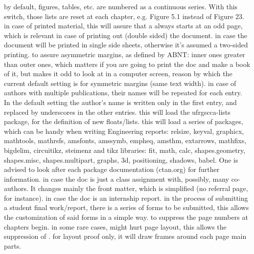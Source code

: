 \documentclass[dctools,english]{ufrgscca} %
\begin{document}
\begin{Options}
	 by default, figures, tables, etc. are numbered as a continuous series. With this switch, those lists are reset at each chapter, e.g. Figure 5.1 instead of Figure 23.
	 in case of printed material, this will assure that a \Macro{\chapter}{} always starts at an odd page, which is relevant in case of printing out (double sided) the document.
	 in case the document will be printed in single side sheets, otherwise it's assumed a two-sided printing.
	 to assure asymmetric margins, as defined by ABNT: inner ones greater than outer ones, which matters if you are going to print the doc and make a book of it, but makes it odd to look at in a computer screen, reason by which the current default setting is for symmetric margins (same text width).
	 in case of authors with multiple publications, their names will be repeated for each entry. In the default setting the author's name is written only in the first entry, and replaced by underscores in the other entries.
	 this will load the {\MetaFmt[Pack]\sffamily ufrgscca-lists} package, for the definition of new floats/lists.
	 this will load a series of packages, which can be handy when writing Engineering reports: {\MetaFmt[Pack]\sffamily relsize, keyval, graphicx, mathtools, mathrsfs, amsfonts, amssymb, empheq, amsthm, ext\-arrows, mathfixs, bigdelim, circuitikz, steimenz} and tikz libraries: {\MetaFmt[Pack]\sffamily fit,  math, calc, shapes.geometry, shapes.misc, shapes.multipart, graphs, 3d, positioning, shadows, babel}. One is advised to look after each package documentation (ctan.org) for further information.
	 in case the doc is just a class assignment with, possibly, many co-authors. It changes mainly the front matter, which is simplified (no referral page, for instance).
	 in case the doc is an internship report.
	 in the process of submitting a student final work/report, there is a series of forms to be submitted, this allows the customization  of said forms in a simple  way.
	 to suppress the page numbers at chapters begin.
	 in some rare cases,  might hurt page layout, this allows the suppression of .
	 for layout proof only, it will draw frames around each page main parts.

\end{Options}
\end{document}
